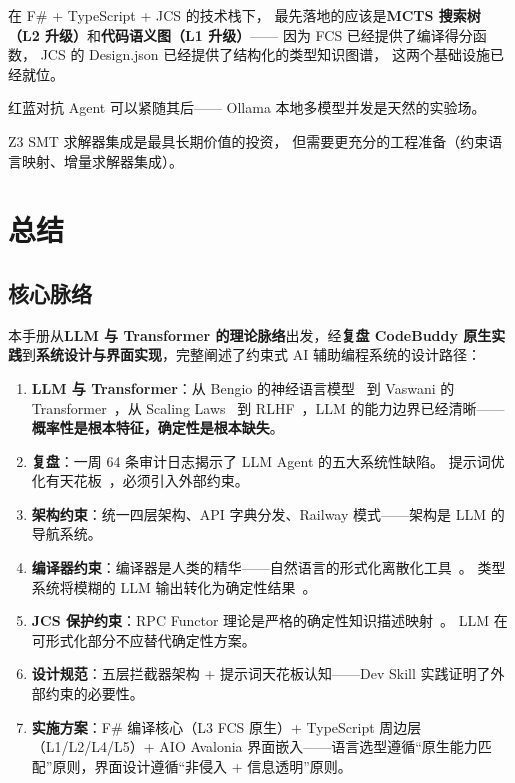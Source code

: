 \documentclass[10pt, openany]{book}
\begin{document}
\begin{principle}[演进原则]
    在 F\# + TypeScript + JCS 的技术栈下，
    最先落地的应该是\textbf{MCTS 搜索树（L2 升级）}和\textbf{代码语义图（L1 升级）}——
    因为 FCS 已经提供了编译得分函数，
    JCS 的 Design.json 已经提供了结构化的类型知识图谱，
    这两个基础设施已经就位。
    
    红蓝对抗 Agent 可以紧随其后——
    Ollama 本地多模型并发是天然的实验场。
    
    Z3 SMT 求解器集成是最具长期价值的投资，
    但需要更充分的工程准备（约束语言映射、增量求解器集成）。
\end{principle}

\chapter*{总结}
{}

\section*{核心脉络}

本手册从\textbf{LLM 与 Transformer 的理论脉络}出发，经\textbf{复盘 CodeBuddy 原生实践}到\textbf{系统设计与界面实现}，完整阐述了约束式 AI 辅助编程系统的设计路径：

\begin{enumerate}
    \item \textbf{LLM 与 Transformer}：从 Bengio 的神经语言模型~\cite{Bengio2003NNLM} 到 Vaswani 的 Transformer~\cite{Vaswani2017Attention}，从 Scaling Laws~\cite{Kaplan2020Scaling} 到 RLHF~\cite{Ouyang2022InstructGPT}，LLM 的能力边界已经清晰——\textbf{概率性是根本特征，确定性是根本缺失}。
    \item \textbf{复盘}：一周 64 条审计日志揭示了 LLM Agent 的五大系统性缺陷。
        提示词优化有天花板~\cite{Liu2023LostInMiddle}，必须引入外部约束。
    \item \textbf{架构约束}：统一四层架构、API 字典分发、Railway 模式——架构是 LLM 的导航系统。
    \item \textbf{编译器约束}：编译器是人类的精华——自然语言的形式化离散化工具~\cite{Aho2006Compilers}。
        类型系统将模糊的 LLM 输出转化为确定性结果~\cite{Pierce2002TAPL}。
    \item \textbf{JCS 保护约束}：RPC Functor 理论是严格的确定性知识描述映射~\cite{Chen2024RPCFunctor}。
        LLM 在可形式化部分不应替代确定性方案。
    \item \textbf{设计规范}：五层拦截器架构 + 提示词天花板认知——Dev Skill 实践证明了外部约束的必要性。
    \item \textbf{实施方案}：F\# 编译核心（L3 FCS 原生）+ TypeScript 周边层（L1/L2/L4/L5）+ AIO Avalonia 界面嵌入——语言选型遵循``原生能力匹配''原则，界面设计遵循``非侵入 + 信息透明''原则。
\end{enumerate}
\end{document}
